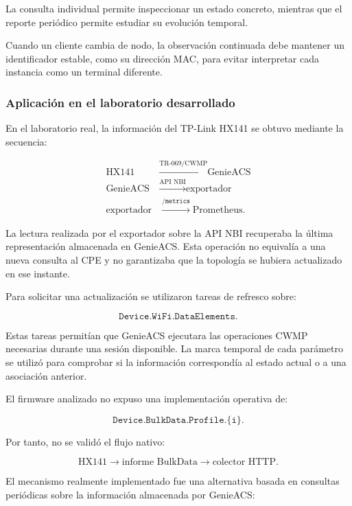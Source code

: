 La consulta individual permite inspeccionar un estado concreto, mientras
que el reporte periódico permite estudiar su evolución temporal.

Cuando un cliente cambia de nodo, la observación continuada debe mantener
un identificador estable, como su dirección MAC, para evitar interpretar
cada instancia como un terminal diferente.


\subsubsection*{Aplicación en el laboratorio desarrollado}

En el laboratorio real, la información del TP-Link HX141 se obtuvo
mediante la secuencia:

\[
\begin{aligned}
    \text{HX141}
    &\xrightarrow{\text{TR-069/CWMP}}
    \text{GenieACS}\\
    \text{GenieACS}
    &\xrightarrow{\text{API NBI}}
    \text{exportador}\\
    \text{exportador}
    &\xrightarrow{\texttt{/metrics}}
    \text{Prometheus}.
\end{aligned}
\]

La lectura realizada por el exportador sobre la API NBI recuperaba la
última representación almacenada en GenieACS. Esta operación no equivalía
a una nueva consulta al CPE y no garantizaba que la topología se hubiera
actualizado en ese instante.

Para solicitar una actualización se utilizaron tareas de refresco sobre:

\[
    \texttt{Device.WiFi.DataElements.}
\]

Estas tareas permitían que GenieACS ejecutara las operaciones CWMP
necesarias durante una sesión disponible. La marca temporal de cada
parámetro se utilizó para comprobar si la información correspondía al
estado actual o a una asociación anterior.

El firmware analizado no expuso una implementación operativa de:

\[
    \texttt{Device.BulkData.Profile.\{i\}.}
\]

Por tanto, no se validó el flujo nativo:

\[
    \text{HX141}
    \longrightarrow
    \text{informe BulkData}
    \longrightarrow
    \text{colector HTTP}.
\]

El mecanismo realmente implementado fue una alternativa basada en
consultas periódicas sobre la información almacenada por GenieACS:

